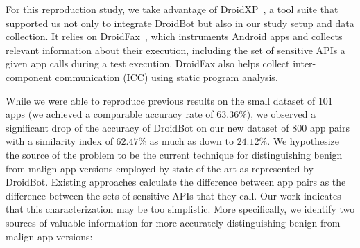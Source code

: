 For this reproduction study, we take advantage of DroidXP~\cite{DBLP:conf/scam/CostaMCMVBC20}, a tool suite that supported us not only to integrate DroidBot but also in our study setup and data collection. It relies on DroidFax~\cite{DBLP:conf/icsm/CaiR17a}, which instruments Android apps and collects relevant information about their execution, including the set of sensitive APIs a given app calls during a test execution. DroidFax also helps collect inter-component communication (ICC) using  static program analysis.


While we were able to reproduce previous results 
on the small dataset of $101$ apps (we achieved a comparable accuracy rate of $63.36\%$), 
we observed a significant drop of the accuracy of DroidBot on our new dataset of $800$ 
app pairs with a similarity index of $62.47\%$ as much as down to $24.12\%$.
%
We hypothesize the source of the problem to be the current technique 
for distinguishing benign from malign app versions employed 
by state of the art as represented by
DroidBot. Existing approaches calculate the
difference between app pairs as
the difference between the sets of sensitive APIs 
that they call. Our work indicates that this characterization may be too simplistic.
More specifically, we identify two 
sources of valuable information for more accurately
distinguishing benign from malign app versions:

